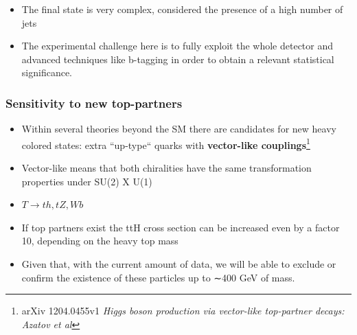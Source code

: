 \documentclass[9pt, xcolor=dvipsnames]{beamer}
\begin{document}
\begin{frame}
\begin{minipage}{.45\columnwidth}
\end{minipage}
\begin{itemize}
\item The final state is very complex, considered the presence of a
high number of jets
\item The experimental challenge here is to fully exploit the whole detector
and advanced techniques like b-tagging in order to obtain a relevant statistical significance.
\end{itemize}
\end{frame}
\begin{frame}
\frametitle{Sensitivity to new top-partners}
\begin{itemize}
\item Within several theories beyond the SM there are candidates for new heavy colored states: extra ``up-type`` quarks with
\textbf{vector-like couplings}\footnote{arXiv 1204.0455v1 \itshape{Higgs boson production via vector-like top-partner decays}:
Azatov et al }
\item Vector-like means that both chiralities have the same transformation
properties under SU(2) X U(1)
\pause
\item $T\rightarrow th, tZ, Wb$
 \item If top partners exist the ttH cross section can be increased even by a factor 10,
depending on the heavy top mass
\item Given that, with the current amount of data, we will be able
to exclude or confirm the existence of these particles up to ∼400 GeV of mass.
\end{itemize}

\end{frame}








\end{document}
